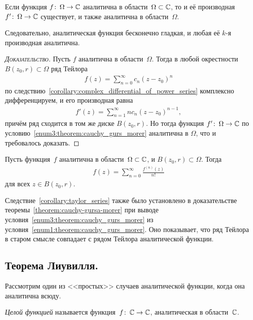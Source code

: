 \documentclass[../complex-analysis.tex]{subfiles}
\begin{document}
\begin{crly}
 Если функция $ f \colon\,\Omega\to\mathbb{C} $ аналитична в области~$ \Omega \subset \mathbb{C}$, то и её производная $ f' \colon\,\Omega\to\mathbb{C} $ существует, и также аналитична в области~$ \Omega $.

 Следовательно, аналитическая функция бесконечно гладкая, и любая её $ k $-я производная аналитична.
\end{crly}
\begin{proof}[\normalfont\textsc{Доказательство}]
 Пусть $ f $ аналитична в области~$ \Omega $. Тогда в любой окрестности~$ B(z_0, r) \subset \Omega $ ряд Тейлора
 \begin{align*}
  f(z) = \sum_{n=0}^{\infty} c_n (z-z_0)^{n}
 \end{align*} по следствию~\ref{corollary:complex_differential_of_power_series} комплексно дифференцируем, и его производная равна
 \begin{align*}
  f'(z) = \sum_{n=1}^{\infty} nc_n (z-z_0)^{n-1},
 \end{align*} причём ряд сходится в том же диске $ B(z_0,r) $. Но тогда функция $ f' \colon\,\Omega\to\mathbb{C} $ по условию~\ref{enum3:theorem:cauchy_gurs_morer} аналитична в $ \Omega $, что и требовалось доказать.
\end{proof}

\begin{crly}
 \label{corollary:taylor_series}
 Пусть функция~$ f $ аналитична в области~$ \Omega \subset \mathbb{C} $, и $ B(z_0, r) \subset \Omega $. Тогда
 \begin{align*}
  f(z) = \sum_{n=0}^{\infty} \frac{f^{(n)}(z)}{n!}
 \end{align*} для всех $ z \in B(z_0,r) $.
\end{crly}

Следствие~\ref{corollary:taylor_series} также было установлено в доказательстве теоремы~\ref{theorem:cauchy-gursa-morer} при выводе условия~\ref{enum3:theorem:cauchy_gurs_morer} из условия~\ref{enum1:theorem:cauchy_gurs_morer}. Оно показывает, что ряд Тейлора в старом смысле совпадает с рядом Тейлора аналитической функции.


\subsection{Теорема Лиувилля.}

Рассмотрим один из <<простых>> случаев аналитической функции, когда она аналитична всюду.

\begin{df}
 \emph{Целой функцией} называется функция~$ f\colon\,\mathbb{C}\to\mathbb{C} $, аналитическая в области~$ \mathbb{C} $.
\end{df}
\end{document}
